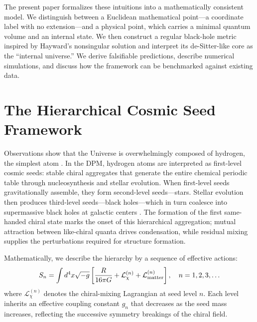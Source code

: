 \documentclass[11pt,a4paper]{article}
\begin{document}
The present paper formalizes these intuitions into a mathematically consistent model. We distinguish between a Euclidean mathematical point---a coordinate label with no extension---and a physical point, which carries a minimal quantum volume and an internal state. We then construct a regular black-hole metric inspired by Hayward's nonsingular solution \cite{hayward2006} and interpret its de-Sitter-like core as the ``internal universe.'' We derive falsifiable predictions, describe numerical simulations, and discuss how the framework can be benchmarked against existing data.

\section{The Hierarchical Cosmic Seed Framework}

Observations show that the Universe is overwhelmingly composed of hydrogen, the simplest atom \cite{draine2011}. In the DPM, hydrogen atoms are interpreted as first-level cosmic seeds: stable chiral aggregates that generate the entire chemical periodic table through nucleosynthesis and stellar evolution. When first-level seeds gravitationally assemble, they form second-level seeds---stars. Stellar evolution then produces third-level seeds---black holes---which in turn coalesce into supermassive black holes at galactic centers \cite{kormendy2013}. The formation of the first same-handed chiral state marks the onset of this hierarchical aggregation; mutual attraction between like-chiral quanta drives condensation, while residual mixing supplies the perturbations required for structure formation.

Mathematically, we describe the hierarchy by a sequence of effective actions:
\begin{equation}
S_n = \int d^4x \sqrt{-g} \left[ \frac{R}{16\pi G} + \mathcal{L}_\chi^{(n)} + \mathcal{L}_{\rm matter}^{(n)} \right], \quad n = 1, 2, 3, \ldots
\label{eq:action}
\end{equation}
where $\mathcal{L}_\chi^{(n)}$ denotes the chiral-mixing Lagrangian at seed level $n$. Each level inherits an effective coupling constant $g_n$ that decreases as the seed mass increases, reflecting the successive symmetry breakings of the chiral field.
\end{document}
